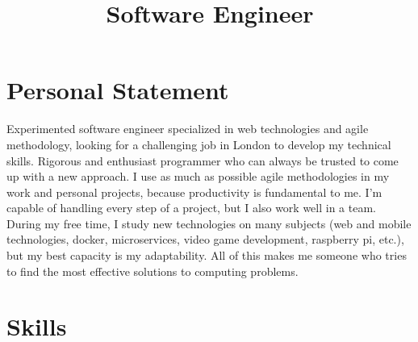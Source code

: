 \documentclass[11pt,a4paper]{moderncv}
\title{Software Engineer}
\begin{document}
\makecvtitle
\vspace*{-7mm}

\section{Personal Statement}
    Experimented software engineer specialized in web technologies and agile methodology, looking for a challenging job in London to develop my technical skills. 
\medskip \newline
    Rigorous and enthusiast programmer who can always be trusted to come up with a new approach. 
    I use as much as possible agile methodologies in my work and personal projects, because productivity is fundamental to me.
    I'm capable of handling every step of a project, but I also work well in a team. 
\medskip \newline
    During my free time, I study new technologies on many subjects (web and mobile technologies, docker, microservices, video game development, raspberry pi, etc.), but my best capacity is my adaptability. 
    All of this makes me someone who tries to find the most effective solutions to computing problems.

\section{Skills}
\end{document}
